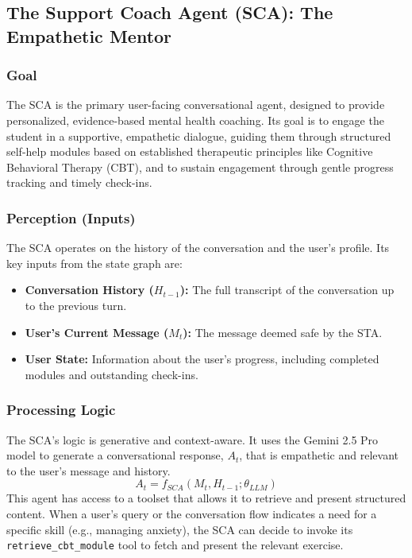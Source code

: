 \subsection{The Support Coach Agent (SCA): The Empathetic Mentor}

\subsubsection{Goal}
The SCA is the primary user-facing conversational agent, designed to provide personalized, evidence-based mental health coaching. Its goal is to engage the student in a supportive, empathetic dialogue, guiding them through structured self-help modules based on established therapeutic principles like Cognitive Behavioral Therapy (CBT), and to sustain engagement through gentle progress tracking and timely check-ins.

\subsubsection{Perception (Inputs)}
The SCA operates on the history of the conversation and the user's profile. Its key inputs from the state graph are:
\begin{itemize}
    \item \textbf{Conversation History ($H_{t-1}$):} The full transcript of the conversation up to the previous turn.
    \item \textbf{User's Current Message ($M_t$):} The message deemed safe by the STA.
    \item \textbf{User State:} Information about the user's progress, including completed modules and outstanding check-ins.
\end{itemize}

\subsubsection{Processing Logic}
The SCA's logic is generative and context-aware. It uses the Gemini 2.5 Pro model to generate a conversational response, $A_t$, that is empathetic and relevant to the user's message and history.
$$ A_t = f_{SCA}(M_t, H_{t-1}; \theta_{LLM}) $$
This agent has access to a toolset that allows it to retrieve and present structured content. When a user's query or the conversation flow indicates a need for a specific skill (e.g., managing anxiety), the SCA can decide to invoke its \texttt{retrieve\_cbt\_module} tool to fetch and present the relevant exercise.

